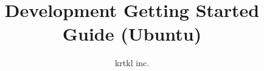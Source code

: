 
%
%
\title{Development Getting Started Guide (Ubuntu)}
\author{krtkl inc.}

\makeatletter




	\maketitle

	
	
	



